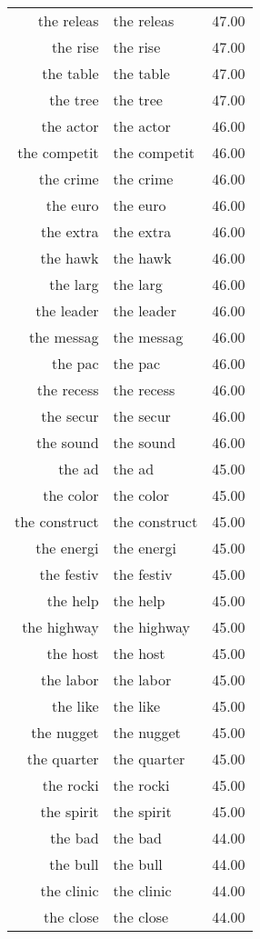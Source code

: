 \begin{table}[ht]
\begin{tabular}{rlr}
  the releas & the releas & 47.00 \\ 
  the rise & the rise & 47.00 \\ 
  the table & the table & 47.00 \\ 
  the tree & the tree & 47.00 \\ 
  the actor & the actor & 46.00 \\ 
  the competit & the competit & 46.00 \\ 
  the crime & the crime & 46.00 \\ 
  the euro & the euro & 46.00 \\ 
  the extra & the extra & 46.00 \\ 
  the hawk & the hawk & 46.00 \\ 
  the larg & the larg & 46.00 \\ 
  the leader & the leader & 46.00 \\ 
  the messag & the messag & 46.00 \\ 
  the pac & the pac & 46.00 \\ 
  the recess & the recess & 46.00 \\ 
  the secur & the secur & 46.00 \\ 
  the sound & the sound & 46.00 \\ 
  the ad & the ad & 45.00 \\ 
  the color & the color & 45.00 \\ 
  the construct & the construct & 45.00 \\ 
  the energi & the energi & 45.00 \\ 
  the festiv & the festiv & 45.00 \\ 
  the help & the help & 45.00 \\ 
  the highway & the highway & 45.00 \\ 
  the host & the host & 45.00 \\ 
  the labor & the labor & 45.00 \\ 
  the like & the like & 45.00 \\ 
  the nugget & the nugget & 45.00 \\ 
  the quarter & the quarter & 45.00 \\ 
  the rocki & the rocki & 45.00 \\ 
  the spirit & the spirit & 45.00 \\ 
  the bad & the bad & 44.00 \\ 
  the bull & the bull & 44.00 \\ 
  the clinic & the clinic & 44.00 \\ 
  the close & the close & 44.00 \\ 

\end{tabular}
\end{table}
